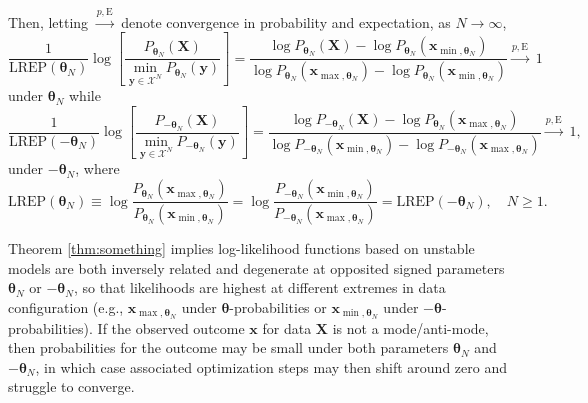 \documentclass[numbib]{imamat}
\theoremstyle{theorem}
\theoremstyle{lemma}
\theoremstyle{example}
\theoremstyle{corollary}
\theoremstyle{definition}
\theoremstyle{remark}
\theoremstyle{approximation}
\theoremstyle{scheme}
\newcommand{\REP}{\mathrm{LREP}}
\newcommand{\ak}[1]{{\color{blue} #1}}
\begin{document}
Then, letting \(\stackrel{p, \mathrm{E}}{\longrightarrow}\) denote convergence in probability and expectation, as \(N\to \infty\),
\[
\frac{1}{\REP(\boldsymbol \theta_N)} \log\left[ \frac{P_{\boldsymbol \theta_N }(\boldsymbol X) }{ \displaystyle{\min_{\boldsymbol y\in\mathcal{X}^N}} P_{\boldsymbol \theta_N }(\boldsymbol y)}\right] = \frac{ \log P_{\boldsymbol \theta_N } ( \boldsymbol X)  - \log P_{\boldsymbol \theta_N }(\boldsymbol{x}_{\min, \boldsymbol \theta_N}) }
{ \log P_{\boldsymbol \theta_N } (\boldsymbol{x}_{\max, \boldsymbol \theta_N})  - \log P_{\boldsymbol \theta_N }(\boldsymbol{x}_{\min, \boldsymbol \theta_N}) }
\stackrel{p, \mathrm{E}}{\longrightarrow}
\; 1
\]
under \(\boldsymbol\theta_N\) while
\[
\frac{1}{\REP(-\boldsymbol \theta_N)} \log\left[ \frac{P_{-\boldsymbol \theta_N }(\boldsymbol X) }{  \displaystyle{\min_{\boldsymbol y\in\mathcal{X}^N}} P_{-\boldsymbol \theta_N }(\boldsymbol y)} \right]
=    \frac{ \log P_{-\boldsymbol \theta_N } ( \boldsymbol X) - \log P_{ \boldsymbol \theta_N }(\boldsymbol{x}_{\max, \boldsymbol \theta_N})    }
{ \log P_{-\boldsymbol \theta_N } (\boldsymbol{x}_{\min, \boldsymbol \theta_N})  - \log P_{-\boldsymbol \theta_N }(\boldsymbol{x}_{\max, \boldsymbol \theta_N}) }
\stackrel{p,\mathrm{E}}{\longrightarrow}
\; 1,
\]
under \(-\boldsymbol\theta_N\), where
\[
\REP( \boldsymbol \theta_N) \equiv \log \frac{P_{\boldsymbol \theta_N } (\boldsymbol{x}_{\max, \boldsymbol \theta_N})}{P_{\boldsymbol \theta_N }(\boldsymbol{x}_{\min, \boldsymbol \theta_N})} = \log  \frac{P_{-\boldsymbol \theta_N } (\boldsymbol{x}_{\min, \boldsymbol \theta_N}) }{ P_{-\boldsymbol \theta_N }(\boldsymbol{x}_{\max, \boldsymbol \theta_N})}=   \REP( -\boldsymbol \theta_N), \quad N \geq 1.
\]

Theorem \ref{thm:something} \ak{implies} log-likelihood functions based on unstable models are both inversely related and degenerate at opposited signed parameters \(\boldsymbol \theta_N\) or \(-\boldsymbol \theta_N\), so that likelihoods are highest at different extremes in data configuration (e.g., \(\boldsymbol{x}_{\max, \boldsymbol \theta_N}\) under \(\boldsymbol \theta\)-probabilities or \(\boldsymbol{x}_{\min, \boldsymbol \theta_N}\) under \(-\boldsymbol \theta\)-probabilities). If the observed outcome \(\boldsymbol x\) for data \(\boldsymbol X\) is not a mode/anti-mode, then probabilities for the outcome may be small under both parameters \(\boldsymbol \theta_N\) and \(-\boldsymbol \theta_N\), in which case associated optimization steps may then shift around zero and struggle to converge.
\end{document}
